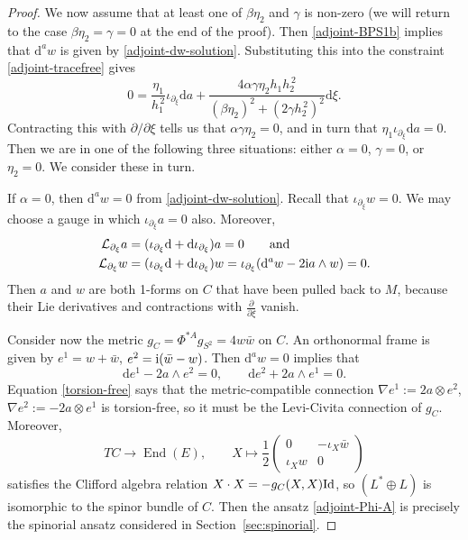 \documentclass[pdftex]{sigma}
\newcommand{\1}{{\mathbb{1}}}
\newcommand{\lto}{\longrightarrow}
\def \d{\mathrm{d}}
\numberwithin{equation}{section}
\begin{document}
\begin{proof}
We now assume that at least one of $\beta\eta_2$ and $\gamma$ is non-zero (we will return to the case $\beta\eta_2=\gamma=0$ at the end of the proof). Then \eqref{adjoint-BPS1b} implies that $\d^aw$ is given by \eqref{adjoint-dw-solution}. Substituting this into the constraint \eqref{adjoint-tracefree} gives
\begin{equation*}
0 = \frac{\eta_1}{h_1^{\,2}}\iota_{\partial_\xi}\d a + \frac{4\alpha\gamma\eta_2 h_1h_2^{\,2}}{(\beta\eta_2)^2+(2\gamma h_2^{\,2})^2}\d\xi.
\end{equation*}
Contracting this with $\partial/\partial\xi$ tells us that $\alpha\gamma\eta_2=0$, and in turn that $\eta_1\iota_{\partial_\xi}\d a=0$. Then we are in one of the following three situations: either $\alpha=0$, $\gamma=0$, or $\eta_2=0$. We consider these in turn.

If $\alpha=0$, then $\d^a w=0$ from \eqref{adjoint-dw-solution}. Recall that $\iota_{\partial_\xi}w=0$. We may choose a gauge in which $\iota_{\partial_\xi}a=0$ also. Moreover,
\begin{equation*}
\begin{aligned}
\mathcal{L}_{\partial_\xi}a &= (\iota_{\partial_\xi}\d + \d\iota_{\partial_\xi})a=0 \qquad\text{and}\\
\mathcal{L}_{\partial_\xi}w &= (\iota_{\partial_\xi}\d + \d\iota_{\partial_\xi})w=\iota_{\partial_\xi}(\d^aw-2{\rm i}a\wedge w)=0.
\end{aligned}
\end{equation*}
Then $a$ and $w$ are both 1-forms on $C$ that have been pulled back to $M$, because their Lie derivatives and contractions with $\frac{\partial}{\partial \xi}$ vanish.

Consider now the metric $g_C=\Phi^{\ast A}g_{S^2}=4w\bar{w}$ on $C$. An orthonormal frame is given by $e^1=w+\bar{w}$, $e^2={\rm i}(\bar{w}-w)$. Then $\d^aw=0$ implies that
\begin{equation}
\label{torsion-free}
\d e^1 -2a\wedge e^2=0,\qquad \d e^2 +2a\wedge e^1=0.
\end{equation}
Equation \eqref{torsion-free} says that the metric-compatible connection $\nabla e^1:=2a\otimes e^2$, $\nabla e^2:=-2a\otimes e^1$ is torsion-free, so it must be the Levi-Civita connection of $g_C$. Moreover,
\begin{equation*}
TC\lto \operatorname{End}(E), \qquad X\mapsto \frac12\begin{pmatrix}0&-\iota_X\bar{w}\\ \iota_X w&0\end{pmatrix}
\end{equation*}
satisfies the Clifford algebra relation $X\cdot X=-g_C(X,X){\rm Id}$, so $(L^\ast\oplus L)$ is isomorphic to the spinor bundle of $C$. Then the ansatz \eqref{adjoint-Phi-A} is precisely the spinorial ansatz considered in Section~\ref{sec:spinorial}.


\end{proof}
\end{document}
